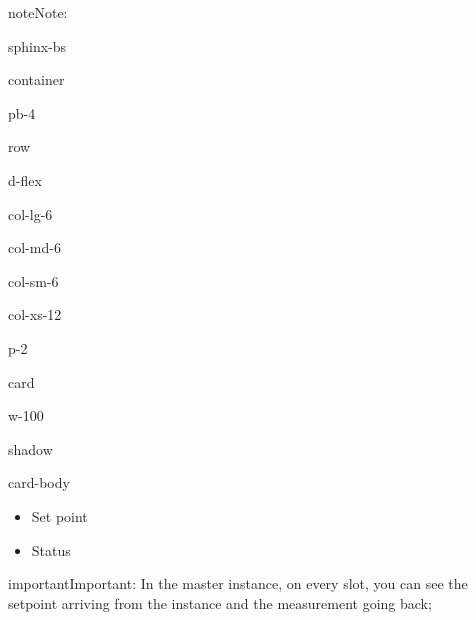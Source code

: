 \documentclass[letterpaper,10pt,english]{jupyterBook}
\begin{document}
\begin{sphinxadmonition}{note}{Note:}
\begin{sphinxuseclass}{sphinx-bs}
\begin{sphinxuseclass}{container}
\begin{sphinxuseclass}{pb-4}
\begin{sphinxuseclass}{row}
\begin{sphinxuseclass}{d-flex}
\begin{sphinxuseclass}{col-lg-6}
\begin{sphinxuseclass}{col-md-6}
\begin{sphinxuseclass}{col-sm-6}
\begin{sphinxuseclass}{col-xs-12}
\begin{sphinxuseclass}{p-2}
\begin{sphinxuseclass}{card}
\begin{sphinxuseclass}{w-100}
\begin{sphinxuseclass}{shadow}
\begin{sphinxuseclass}{card-body}
\begin{itemize}
\item {} 
\sphinxAtStartPar
Set point

\item {} 
\sphinxAtStartPar
Status

\end{itemize}

\end{sphinxuseclass}
\end{sphinxuseclass}
\end{sphinxuseclass}
\end{sphinxuseclass}
\end{sphinxuseclass}
\end{sphinxuseclass}
\end{sphinxuseclass}
\end{sphinxuseclass}
\end{sphinxuseclass}
\end{sphinxuseclass}
\end{sphinxuseclass}
\end{sphinxuseclass}
\end{sphinxuseclass}
\end{sphinxuseclass}\end{sphinxadmonition}

\begin{sphinxadmonition}{important}{Important:}
\sphinxAtStartPar
In the master instance, on every slot, you can see the setpoint arriving from the instance and the measurement going back;
\end{sphinxadmonition}







\renewcommand{\indexname}{Index}
\printindex
\end{document}
